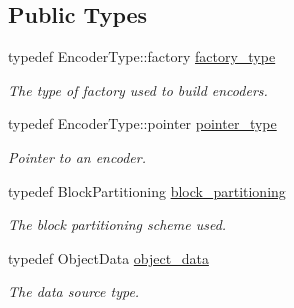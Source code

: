 \subsection*{Public Types}
\begin{DoxyCompactItemize}
\item 
\hypertarget{classkodo_1_1object__encoder_ad9e399452c48178bb156e39fedb72fa3}{typedef Encoder\-Type\-::factory \hyperlink{classkodo_1_1object__encoder_ad9e399452c48178bb156e39fedb72fa3}{factory\-\_\-type}}\label{classkodo_1_1object__encoder_ad9e399452c48178bb156e39fedb72fa3}

\begin{DoxyCompactList}\small\item\em The type of factory used to build encoders. \end{DoxyCompactList}\item 
\hypertarget{classkodo_1_1object__encoder_afc4b239a485fcf3d53baf2774fea093b}{typedef Encoder\-Type\-::pointer \hyperlink{classkodo_1_1object__encoder_afc4b239a485fcf3d53baf2774fea093b}{pointer\-\_\-type}}\label{classkodo_1_1object__encoder_afc4b239a485fcf3d53baf2774fea093b}

\begin{DoxyCompactList}\small\item\em Pointer to an encoder. \end{DoxyCompactList}\item 
\hypertarget{classkodo_1_1object__encoder_a3b5e6075e66220bb587c45f1e63a7a50}{typedef Block\-Partitioning \hyperlink{classkodo_1_1object__encoder_a3b5e6075e66220bb587c45f1e63a7a50}{block\-\_\-partitioning}}\label{classkodo_1_1object__encoder_a3b5e6075e66220bb587c45f1e63a7a50}

\begin{DoxyCompactList}\small\item\em The block partitioning scheme used. \end{DoxyCompactList}\item 
\hypertarget{classkodo_1_1object__encoder_a05600877e34f3720c919743f43e6505d}{typedef Object\-Data \hyperlink{classkodo_1_1object__encoder_a05600877e34f3720c919743f43e6505d}{object\-\_\-data}}\label{classkodo_1_1object__encoder_a05600877e34f3720c919743f43e6505d}

\begin{DoxyCompactList}\small\item\em The data source type. \end{DoxyCompactList}\end{DoxyCompactItemize}
